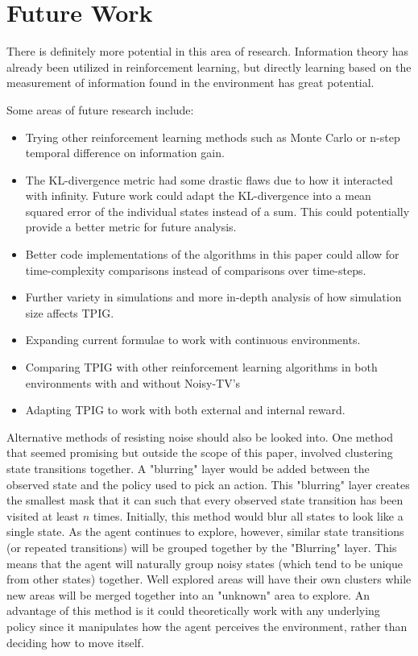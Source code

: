 \documentclass[12pt]{thesis}
\begin{document}
\section{Future Work}
There is definitely more potential in this area of research. Information theory has already been utilized in reinforcement learning, but directly learning based on the measurement of information found in the environment has great potential. 

Some areas of future research include:
\begin{itemize}
	\item Trying other reinforcement learning methods such as Monte Carlo or n-step temporal difference on information gain.
	\item The KL-divergence metric had some drastic flaws due to how it interacted with infinity. Future work could adapt the KL-divergence into a mean squared error of the individual states instead of a sum. This could potentially provide a better metric for future analysis.
	\item Better code implementations of the algorithms in this paper could allow for time-complexity comparisons instead of comparisons over time-steps.
	\item Further variety in simulations and more in-depth analysis of how simulation size affects TPIG.
	\item Expanding current formulae to work with continuous environments.
	\item Comparing TPIG with other reinforcement learning algorithms in both environments with and without Noisy-TV's
	\item Adapting TPIG to work with both external and internal reward.
\end{itemize}

Alternative methods of resisting noise should also be looked into. One method that seemed promising but outside the scope of this paper, involved clustering state transitions together. A "blurring" layer would be added between the observed state and the policy used to pick an action. This "blurring" layer creates the smallest mask that it can such that every observed state transition has been visited at least $n$ times. Initially, this method would blur all states to look like a single state. As the agent continues to explore, however, similar state transitions (or repeated transitions) will be grouped together by the "Blurring" layer. This means that the agent will naturally group noisy states (which tend to be unique from other states) together. Well explored areas will have their own clusters while new areas will be merged together into an "unknown" area to explore. An advantage of this method is it could theoretically work with any underlying policy since it manipulates how the agent perceives the environment, rather than deciding how to move itself.
\end{document}
